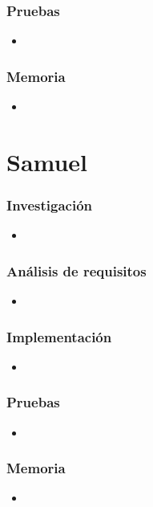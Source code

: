 \subsubsection{Pruebas}
\begin{itemize}
	\item 
\end{itemize}
\subsubsection{Memoria}
\begin{itemize}
	\item 
\end{itemize}

\section{Samuel}
\subsubsection{Investigación}
\begin{itemize}
	\item 
\end{itemize}
\subsubsection{Análisis de requisitos}
\begin{itemize}
	\item 
\end{itemize}
\subsubsection{Implementación}
\begin{itemize}
	\item 
\end{itemize}
\subsubsection{Pruebas}
\begin{itemize}
	\item 
\end{itemize}
\subsubsection{Memoria}
\begin{itemize}
	\item 
\end{itemize}

\noindent
